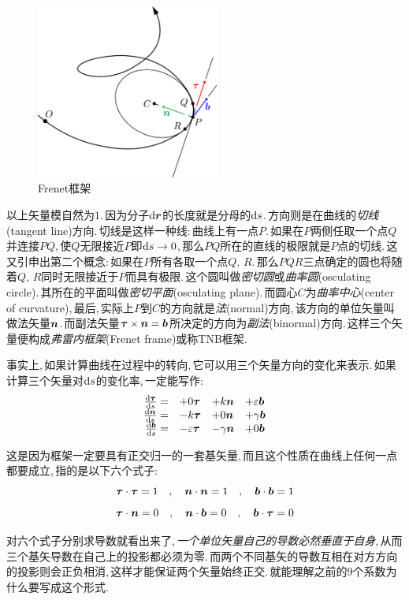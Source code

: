 \begin{figure}\label{6-1-7}
\vspace{-0.2cm}
\centering
\includegraphics[width=6cm]{image/6-1-7.png}
\caption{Frenet框架}
\end{figure}
以上矢量模自然为$1$.\,因为分子$\textrm{d} \boldsymbol{r}$的长度就是分母的$\textrm{d} s$.\,方向则是在曲线的\emph{切线}(tangent line)方向.\,切线是这样一种线:\,曲线上有一点$P$.\,如果在$P$两侧任取一个点$Q$并连接$PQ$,\,使$Q$无限接近$P$即$\textrm{d} s \to 0$,\,那么$PQ$所在的直线的极限就是$P$点的切线.\,这又引申出第二个概念:\,如果在$P$所有各取一个点$Q,\,R$.\,那么$PQR$三点确定的圆也将随着$Q,\,R$同时无限接近于$P$而具有极限.\,这个圆叫做\emph{密切圆}或\emph{曲率圆}(osculating circle).\,其所在的平面叫做\emph{密切平面}(osculating plane).\,而圆心$C$为\emph{曲率中心}(center of curvature),\,最后,\,实际上$P$到$C$的方向就是\emph{法}(normal)方向,\,该方向的单位矢量叫做法矢量$\boldsymbol{n}$.\,而副法矢量$\boldsymbol{\tau}\times\boldsymbol{n}=\boldsymbol{b}$所决定的方向为\emph{副法}(binormal)方向.\,这样三个矢量便构成\emph{弗雷内框架}(Frenet frame)或称TNB框架.

事实上,\,如果计算曲线在过程中的转向,\,它可以用三个矢量方向的变化来表示.\,如果计算三个矢量对$\textrm{d} s$的变化率,\,一定能写作:
\[\begin{array}{rlll}
\frac{\textrm{d} \boldsymbol{\tau}}{\textrm{d} s}=		&	+0\boldsymbol{\tau} 	&	+k\boldsymbol{n} 		& +\varepsilon\boldsymbol{b}\\
\frac{\textrm{d} \boldsymbol{n}}{\textrm{d} s}=		&	-k\boldsymbol{\tau} 	&	+0\boldsymbol{n} 		& +\gamma\boldsymbol{b}\\
\frac{\textrm{d} \boldsymbol{b}}{\textrm{d} s}=		&	-\varepsilon\boldsymbol{\tau} 	&	-\gamma\boldsymbol{n} 		& +0\boldsymbol{b}
\end{array}\]

这是因为框架一定要具有正交归一的一套基矢量,\,而且这个性质在曲线上任何一点都要成立,\,指的是以下六个式子:
\[\boldsymbol{\tau}\cdot\boldsymbol{\tau}=1\quad,\quad\boldsymbol{n}\cdot\boldsymbol{n}=1\quad,\quad \boldsymbol{b}\cdot\boldsymbol{b}=1\]
\[\boldsymbol{\tau}\cdot\boldsymbol{n}=0\quad,\quad\boldsymbol{n}\cdot\boldsymbol{b}=0\quad,\quad \boldsymbol{b}\cdot\boldsymbol{\tau}=0\]

对六个式子分别求导数就看出来了,\,\emph{一个单位矢量自己的导数必然垂直于自身},\,从而三个基矢导数在自己上的投影都必须为零.\,而两个不同基矢的导数互相在对方方向的投影则会正负相消,\,这样才能保证两个矢量始终正交.\,就能理解之前的$9$个系数为什么要写成这个形式.

